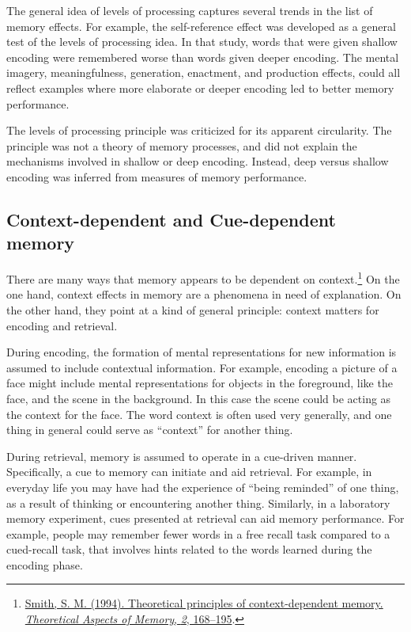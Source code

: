\documentclass[
  oneside,
  12pt]{crumpbook}
\begin{document}
The general idea of levels of processing captures several trends in the list of memory effects. For example, the self-reference effect was developed as a general test of the levels of processing idea. In that study, words that were given shallow encoding were remembered worse than words given deeper encoding. The mental imagery, meaningfulness, generation, enactment, and production effects, could all reflect examples where more elaborate or deeper encoding led to better memory performance.

The levels of processing principle was criticized for its apparent circularity. The principle was not a theory of memory processes, and did not explain the mechanisms involved in shallow or deep encoding. Instead, deep versus shallow encoding was inferred from measures of memory performance.

\hypertarget{context-dependent-and-cue-dependent-memory}{%
\subsection{Context-dependent and Cue-dependent memory}\label{context-dependent-and-cue-dependent-memory}}

There are many ways that memory appears to be dependent on context.\footnote{\protect\hyperlink{ref-smithTheoreticalPrinciplesContextdependent1994}{Smith, S. M. (1994). Theoretical principles of context-dependent memory. \emph{Theoretical Aspects of Memory}, \emph{2}, 168--195}.} On the one hand, context effects in memory are a phenomena in need of explanation. On the other hand, they point at a kind of general principle: context matters for encoding and retrieval.

During encoding, the formation of mental representations for new information is assumed to include contextual information. For example, encoding a picture of a face might include mental representations for objects in the foreground, like the face, and the scene in the background. In this case the scene could be acting as the context for the face. The word context is often used very generally, and one thing in general could serve as ``context'' for another thing.

During retrieval, memory is assumed to operate in a cue-driven manner. Specifically, a cue to memory can initiate and aid retrieval. For example, in everyday life you may have had the experience of ``being reminded'' of one thing, as a result of thinking or encountering another thing. Similarly, in a laboratory memory experiment, cues presented at retrieval can aid memory performance. For example, people may remember fewer words in a free recall task compared to a cued-recall task, that involves hints related to the words learned during the encoding phase.
\end{document}
